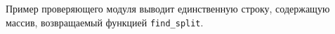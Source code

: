 Пример проверяющего модуля выводит единственную строку, содержащую
массив, возвращаемый функцией \texttt{find\_split}.